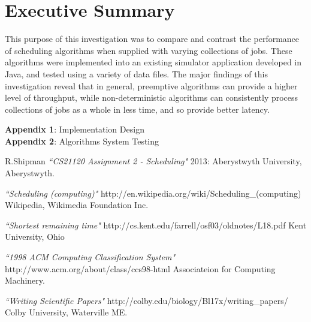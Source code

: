 \documentclass{acm_proc_article-sp}
\begin{document}
\section{Executive Summary}

This purpose of this investigation was to compare and contrast the performance of scheduling algorithms when supplied with varying collections of jobs. These algorithms were implemented into an existing simulator application developed in Java, and tested using a variety of data files. The major findings of this investigation reveal that in general, preemptive algorithms can provide a higher level of throughput, while non-deterministic algorithms can consistently process collections of jobs as a whole in less time, and so provide better latency. 

%

%
%
\appendix
\textbf{Appendix 1}: Implementation Design\\
\textbf{Appendix 2}: Algorithms System Testing

\begin{thebibliography}{1}

  R.Shipman {\em ``CS21120 Assignment 2 - Scheduling"} 2013: Aberystwyth University, Aberystwyth.
 
   {\em ``Scheduling (computing)"} http://en.wikipedia.org/wiki/Scheduling\_(computing) Wikipedia, Wikimedia Foundation Inc.
  
   {\em ``Shortest remaining time"} http://cs.kent.edu/farrell/osf03/oldnotes/L18.pdf Kent University, Ohio
  
    {\em ``1998 ACM Computing Classification System"} http://www.acm.org/about/class/ccs98-html Associateion for Computing Machinery.
   
     {\em ``Writing Scientific Papers"} http://colby.edu/biology/Bl17x/writing\_papers/ Colby University, Waterville ME.
  
 \end{thebibliography}
\end{document}
